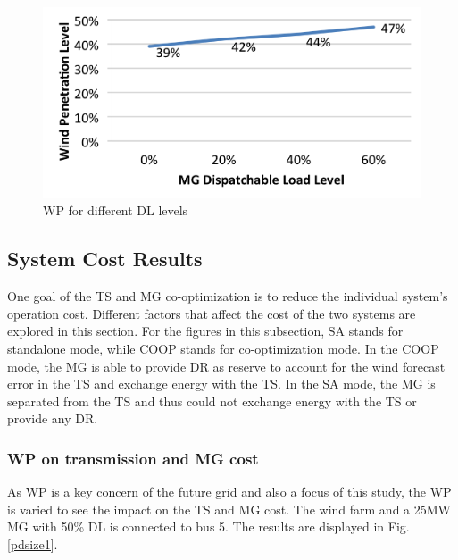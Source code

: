 \begin{figure}[H]
\centering
\includegraphics[scale=0.55]{windpdd.png}
\caption{WP for different DL levels}
\label{wpdd}
\end{figure}

\subsection{System Cost Results}
One goal of the TS and MG co-optimization is to reduce the individual system's operation cost. Different factors that affect the cost of the two systems are explored in this section. For the figures in this subsection, SA stands for standalone mode, while COOP stands for co-optimization mode. In the COOP mode, the MG is able to provide DR as reserve to account for the wind forecast error in the TS and exchange energy with the TS. In the SA mode, the MG is separated from the TS and thus could not exchange energy with the TS or provide any DR.

\subsubsection{WP on transmission and MG cost}
As WP is a key concern of the future grid and also a focus of this study, the WP is varied to see the impact on the TS and MG cost. The wind farm and a 25MW MG with 50\% DL is connected to bus 5. The results are displayed in Fig. \ref{pdsize1}.

